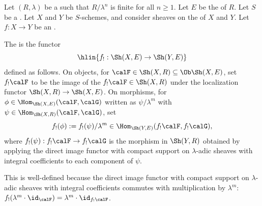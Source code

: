 \begin{definition} \label{definition:direct_image_functor_with_compact_support_on_etale_sheaves_with_rational_adic_coefficients_on_a_noetherian_scheme}
Let $(R, \lambda)$ be a   such that $R/\lambda^n$ is finite for all $n \geq 1$. Let $E$ be the  of $R$. Let $S$ be a . Let $X$ and $Y$ be  $S$-schemes, and consider sheaves on the  of $X$ and $Y$. Let $f: X \to Y$ be an .

The  is the functor
$$\hlin{f_! : \Sh(X, E) \to \Sh(Y, E)}$$
defined as follows. On objects, for $\calF \in \Sh(X, R) \subseteq \Ob \Sh(X, E)$, set $f_! \calF$ to be the image of the  $f_! \calF \in \Sh(X, R)$ under the localization functor $\Sh(X, R) \to \Sh(X, E)$. On morphisms, for $\phi \in \Hom_{\Sh(X, E)}(\calF, \calG)$ written as $\psi / \lambda^m$ with $\psi \in \Hom_{\Sh(X, R)}(\calF, \calG)$, set
$$f_! (\phi) := f_!(\psi) / \lambda^m \in \Hom_{\Sh(Y, E)}(f_! \calF, f_! \calG),$$
where $f_!(\psi): f_! \calF \to f_! \calG$ is the morphism in $\Sh(Y, R)$ obtained by applying the direct image functor with compact support on $\lambda$-adic sheaves with integral coefficients to each component of $\psi$.

This is well-defined because the direct image functor with compact support on $\lambda$-adic sheaves with integral coefficients commutes with multiplication by $\lambda^m$: $f_!(\lambda^m \cdot \id_\calF) = \lambda^m \cdot \id_{f_! \calF}$.
\end{definition}
